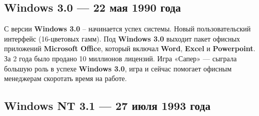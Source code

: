 \documentclass[14pt, a4paper]{article}
\begin{document}
\begin{centering}
    \subsection*{Windows 3.0 — 22 мая 1990 года}
\end{centering}

\begin{figure}[h]%
    \centering
    \label{framework} %
\end{figure}

С версии \textbf{Windows 3.0} – начинается успех системы. Новый пользовательский интерфейс (16-цветовых гамм).
Под \textbf{Windows 3.0} выходит пакет офисных приложений \textbf{Microsoft Office}, который включал
\textbf{Word}, \textbf{Excel} и \textbf{Powerpoint}.
За 2 года было продано 10 миллионов лицензий.
Игра «Сапер» — сыграла большую роль в успехе \textbf{Windows 3.0},
игра и сейчас помогает офисным менеджерам скоротать время на работе.\newpage

\begin{centering}
    \subsection*{Windows NT 3.1 — 27 июля 1993 года}
\end{centering}
\end{document}
